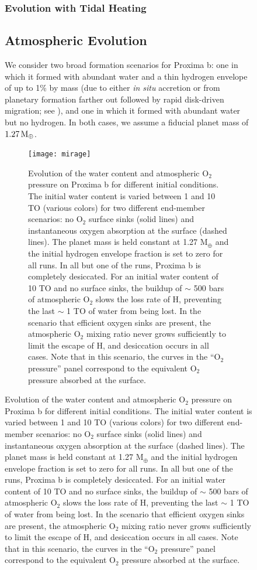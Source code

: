 \documentclass[preprint,12pt]{aastex}
\def\mearth{{\rm\,M_\oplus}}
\begin{document}
\begin{figure}
\subsubsection{Evolution with Tidal Heating}
\label{sec:results:internal:tides}


\subsection{Atmospheric Evolution}
\label{sec:results:atmesc}

We consider two broad formation scenarios for Proxima b: one in which
it formed with abundant water and a thin hydrogen envelope of up to
1\% by mass (due to either \emph{in situ} accretion or from planetary
formation farther out followed by rapid disk-driven migration; see
\cite{Luger15}), and one in which it formed with abundant water but no
hydrogen. In both cases, we assume a fiducial planet mass of $1.27
\mearth$.

\begin{figure}[ht]
\centering
\texttt{[image: mirage]}
\caption{Evolution of the water content and atmospheric O$_2$ pressure
  on Proxima b for different initial conditions. The initial water
  content is varied between 1 and 10 TO (various colors) for two
  different end-member scenarios: no O$_2$ surface sinks (solid lines)
  and instantaneous oxygen absorption at the surface (dashed
  lines). The planet mass is held constant at 1.27 M$_\oplus$ and the
  initial hydrogen envelope fraction is set to zero for all runs. In
  all but one of the runs, Proxima b is completely desiccated. For an
  initial water content of 10 TO and no surface sinks, the buildup of
  $\sim$ 500 bars of atmospheric O$_2$ slows the loss rate of H,
  preventing the last $\sim$ 1 TO of water from being lost. In the
  scenario that efficient oxygen sinks are present, the atmospheric
  O$_2$ mixing ratio never grows sufficiently to limit the escape of
  H, and desiccation occurs in all cases. Note that in this scenario,
  the curves in the ``O$_2$ pressure'' panel correspond to the
  equivalent O$_2$ pressure absorbed at the surface.}
\label{fig:atmesc:mirage}
\end{figure}


\end{figure}
\end{document}
